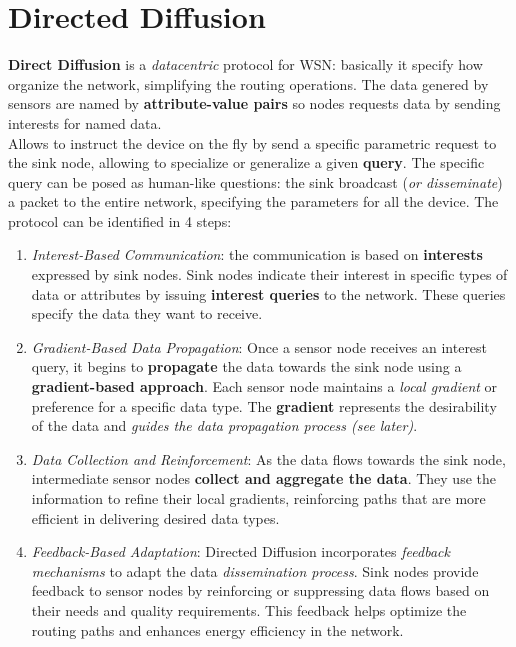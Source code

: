 \documentclass[10pt,a4paper]{report}
\theoremstyle{definition}
\begin{document}
\section{Directed Diffusion}\label{sec:directed-diffusion}
\textbf{Direct Diffusion} is a \textit{datacentric} protocol for WSN: basically it specify how organize the network, simplifying the routing operations. The data genered by sensors are named by \textbf{attribute-value pairs} so nodes requests data by sending interests for named data.\\
Allows to instruct the device on the fly by send a specific parametric request to the sink node, allowing to specialize or generalize a given \textbf{query}.
The specific query can be posed as human-like questions: the sink broadcast (\textit{or disseminate}) a packet to the entire network, specifying the parameters for all the device.
The protocol can be identified in 4 steps:
\begin{enumerate}
	\item 
	\textit{Interest-Based Communication}: the communication is based on \textbf{interests} expressed by sink nodes. Sink nodes indicate their interest in specific types of data or attributes by issuing \textbf{interest queries} to the network. These queries specify the data they want to receive.
	\item 
	\textit{Gradient-Based Data Propagation}: Once a sensor node receives an interest query, it begins to \textbf{propagate} the data towards the sink node using a \textbf{gradient-based approach}. Each sensor node maintains a \textit{local gradient} or preference for a specific data type. The \textbf{gradient} represents the desirability of the data and \textit{guides the data propagation process (see later)}.
	\item 
	\textit{Data Collection and Reinforcement}: As the data flows towards the sink node, intermediate sensor nodes \textbf{collect and aggregate the data}. They use the information to refine their local gradients, reinforcing paths that are more efficient in delivering desired data types.
	\item 
	\textit{Feedback-Based Adaptation}: Directed Diffusion incorporates \textit{feedback mechanisms} to adapt the data \textit{dissemination process}. Sink nodes provide feedback to sensor nodes by reinforcing or suppressing data flows based on their needs and quality requirements. This feedback helps optimize the routing paths and enhances energy efficiency in the network.
\end{enumerate}
\end{document}
